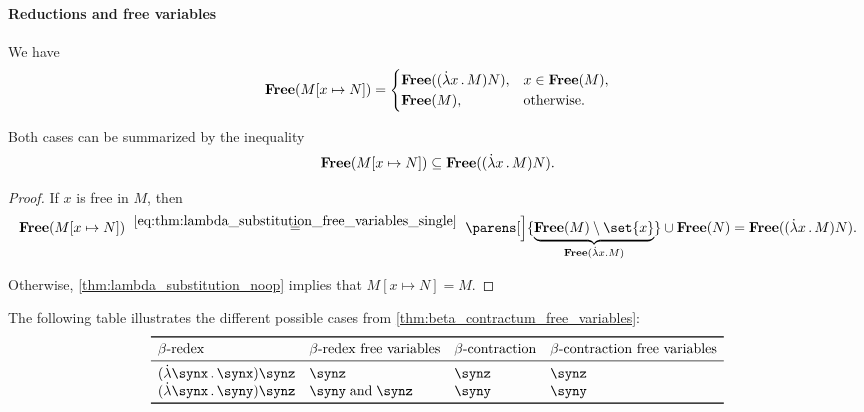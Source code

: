 \paragraph{Reductions and free variables}

\begin{lemma}\label{thm:beta_contractum_free_variables}
  We have
  \begin{equation}\label{eq:thm:beta_contractum_free_variables/equality}
    \op*{Free}(M[x \mapsto N]) = \begin{cases}
      \op*{Free}((\qabs x M) N), &x \in \op*{Free}(M), \\
      \op*{Free}(M),             &\T{otherwise.} \\
    \end{cases}
  \end{equation}

  Both cases can be summarized by the inequality
  \begin{equation}\label{eq:thm:beta_contractum_free_variables/inequality}
    \op*{Free}(M[x \mapsto N]) \subseteq \op*{Free}((\qabs x M) N).
  \end{equation}
\end{lemma}
\begin{proof}
  If \( x \) is free in \( M \), then
  \begin{equation*}
    \op*{Free}(M[x \mapsto N])
    \reloset {\eqref{eq:thm:lambda_substitution_free_variables_single}} =
    \parens[\Big]{ \underbrace{ \op*{Free}(M) \setminus \set{ x } }_{\op*{Free}(\qabs x M)} } \cup \op*{Free}(N)
    =
    \op*{Free}((\qabs x M) N).
  \end{equation*}

  Otherwise, \cref{thm:lambda_substitution_noop} implies that \( M[x \mapsto N] = M \).
\end{proof}

\begin{example}\label{ex:thm:lambda_term_reduction_free_variables}
  The following table illustrates the different possible cases from \cref{thm:beta_contractum_free_variables}:
  \begin{equation*}
    \begin{array}{*{4}{l}}
      \toprule
      \T{\( \beta \)-redex}     & \T{\( \beta \)-redex free variables} & \T{\( \beta \)-contraction} & \T{\( \beta \)-contraction free variables} \\
      \midrule
      (\qabs \synx \synx) \synz & \synz                                & \synz                       & \synz                                      \\
      (\qabs \synx \syny) \synz & \syny \T{and} \synz                  & \syny                       & \syny                                      \\
      \bottomrule
    \end{array}
  \end{equation*}
\end{example}

